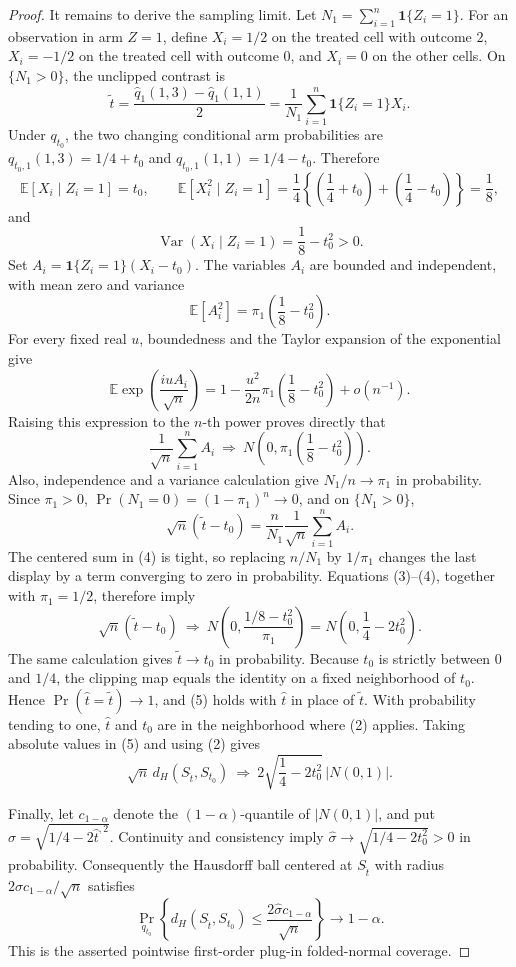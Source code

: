 \documentclass{article}
\begin{document}
\begin{proof}
It remains to derive the sampling limit.  Let \(N_1=\sum_{i=1}^n\mathbf 1\{Z_i=1\}\).  For an observation in arm \(Z=1\), define \(X_i=1/2\) on the treated cell with outcome \(2\), \(X_i=-1/2\) on the treated cell with outcome \(0\), and \(X_i=0\) on the other cells.  On \(\{N_1>0\}\), the unclipped contrast is
\[
\widetilde t
=\frac{\widehat q_1(1,3)-\widehat q_1(1,1)}2
=\frac1{N_1}\sum_{i=1}^n\mathbf 1\{Z_i=1\}X_i.
\]
Under \(q_{t_0}\), the two changing conditional arm probabilities are \(q_{t_0,1}(1,3)=1/4+t_0\) and \(q_{t_0,1}(1,1)=1/4-t_0\).  Therefore
\[
\mathbb E[X_i\mid Z_i=1]=t_0,
\qquad
\mathbb E[X_i^2\mid Z_i=1]
=\frac14\left\{\left(\frac14+t_0\right)+\left(\frac14-t_0\right)\right\}
=\frac18,
\]
and
\[
\operatorname{Var}(X_i\mid Z_i=1)=\frac18-t_0^2>0.
\tag{3}
\]
Set \(A_i=\mathbf 1\{Z_i=1\}(X_i-t_0)\).  The variables \(A_i\) are bounded and independent, with mean zero and variance
\[
\mathbb E[A_i^2]=\pi_1\left(\frac18-t_0^2\right).
\]
For every fixed real \(u\), boundedness and the Taylor expansion of the exponential give
\[
\mathbb E\exp\left(\frac{iuA_i}{\sqrt n}\right)
=1-\frac{u^2}{2n}\pi_1\left(\frac18-t_0^2\right)+o(n^{-1}).
\]
Raising this expression to the \(n\)-th power proves directly that
\[
\frac1{\sqrt n}\sum_{i=1}^n A_i
\ \Rightarrow\ 
N\!\left(0,\pi_1\left(\frac18-t_0^2\right)\right).
\tag{4}
\]
Also, independence and a variance calculation give \(N_1/n\to\pi_1\) in probability.  Since \(\pi_1>0\), \(\Pr(N_1=0)=(1-\pi_1)^n\to0\), and on \(\{N_1>0\}\),
\[
\sqrt n(\widetilde t-t_0)
=\frac{n}{N_1}\frac1{\sqrt n}\sum_{i=1}^n A_i.
\]
The centered sum in (4) is tight, so replacing \(n/N_1\) by \(1/\pi_1\) changes the last display by a term converging to zero in probability.  Equations (3)--(4), together with \(\pi_1=1/2\), therefore imply
\[
\sqrt n(\widetilde t-t_0)
\ \Rightarrow\ 
N\!\left(0,\frac{1/8-t_0^2}{\pi_1}\right)
=N\!\left(0,\frac14-2t_0^2\right).
\tag{5}
\]
The same calculation gives \(\widetilde t\to t_0\) in probability.  Because \(t_0\) is strictly between \(0\) and \(1/4\), the clipping map equals the identity on a fixed neighborhood of \(t_0\).  Hence \(\Pr(\widehat t=\widetilde t)\to1\), and (5) holds with \(\widehat t\) in place of \(\widetilde t\).  With probability tending to one, \(\widehat t\) and \(t_0\) are in the neighborhood where (2) applies.  Taking absolute values in (5) and using (2) gives
\[
\sqrt n\,d_H(S_{\widehat t},S_{t_0})
\ \Rightarrow\ 
2\sqrt{\frac14-2t_0^2}\,|N(0,1)|.
\]

Finally, let \(c_{1-\alpha}\) denote the \((1-\alpha)\)-quantile of \(|N(0,1)|\), and put \(\widehat\sigma=\sqrt{1/4-2\widehat t^{,2}}\).  Continuity and consistency imply \(\widehat\sigma\to\sqrt{1/4-2t_0^2}>0\) in probability.  Consequently the Hausdorff ball centered at \(S_{\widehat t}\) with radius \(2\widehat\sigma c_{1-\alpha}/\sqrt n\) satisfies
\[
\Pr_{q_{t_0}}\!\left\{d_H(S_{\widehat t},S_{t_0})
\le \frac{2\widehat\sigma c_{1-\alpha}}{\sqrt n}\right\}
\longrightarrow 1-\alpha.
\]
This is the asserted pointwise first-order plug-in folded-normal coverage.
\end{proof}
\end{document}
